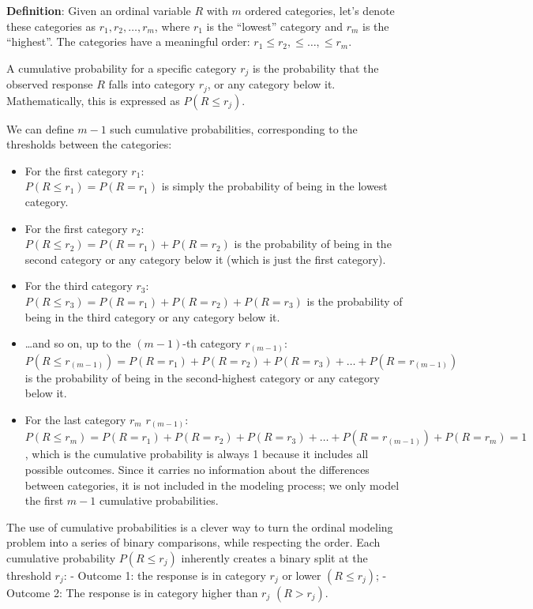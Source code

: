\documentclass[
  letterpaper,
  DIV=11,
  numbers=noendperiod]{scrartcl}
\begin{document}
\textbf{Definition}: Given an ordinal variable \(R\) with \(m\) ordered
categories, let's denote these categories as \(r_1, r_2, \dots, r_m\),
where \(r_1\) is the ``lowest'' category and \(r_m\) is the ``highest''.
The categories have a meaningful order:
\(r_1 \leq r_2, \leq \dots, \leq r_m\).

A cumulative probability for a specific category \(r_j\) is the
probability that the observed response \(R\) falls into category
\(r_j\), or any category below it. Mathematically, this is expressed as
\(P(R \leq r_j)\).

We can define \(m-1\) such cumulative probabilities, corresponding to
the thresholds between the categories:

\begin{itemize}
\item
  For the first category \(r_1\):\\
  \(P(R \leq r_1) = P(R = r_1)\) is simply the probability of being in
  the lowest category.
\item
  For the first category \(r_2\):\\
  \(P(R \leq r_2) = P(R = r_1) + P(R = r_2)\) is the probability of
  being in the second category or any category below it (which is just
  the first category).
\item
  For the third category \(r_3\):\\
  \(P(R \leq r_3) = P(R = r_1) + P(R = r_2) + P(R = r_3)\) is the
  probability of being in the third category or any category below it.
\item
  \ldots and so on, up to the \((m-1)\)-th category \(r_{(m-1)}\):\\
  \(P(R \leq r_{(m-1)}) = P(R = r_1) + P(R = r_2) + P(R = r_3) + \dots + P(R = r_{(m-1)})\)
  is the probability of being in the second-highest category or any
  category below it.
\item
  For the last category \(r_m\) \(r_{(m-1)}\):\\
  \(P(R \leq r_m) = P(R = r_1) + P(R = r_2) + P(R = r_3) + \dots + P(R = r_{(m-1)})+ P(R = r_m)=1\),
  which is the cumulative probability is always 1 because it includes
  all possible outcomes. Since it carries no information about the
  differences between categories, it is not included in the modeling
  process; we only model the first \(m-1\) cumulative probabilities.
\end{itemize}

The use of cumulative probabilities is a clever way to turn the ordinal
modeling problem into a series of binary comparisons, while respecting
the order. Each cumulative probability \(P(R \leq r_j)\) inherently
creates a binary split at the threshold \(r_j\): - Outcome 1: the
response is in category \(r_j\) or lower \((R\leq r_j)\); - Outcome 2:
The response is in category higher than \(r_j\) \((R > r_j)\).
\end{document}

